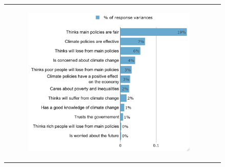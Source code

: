 \documentclass{article}
\begin{document}
\begin{figure}[h!]
\begin{center}
\begin{tabular}{cc}
\begin{subfigure}{0.5\textwidth}
			\includegraphics[width=\textwidth]{lmg_standard_indices_non_standardized}
		\end{subfigure}\\
	\end{tabular}


\end{center}
\end{figure}
\end{document}
